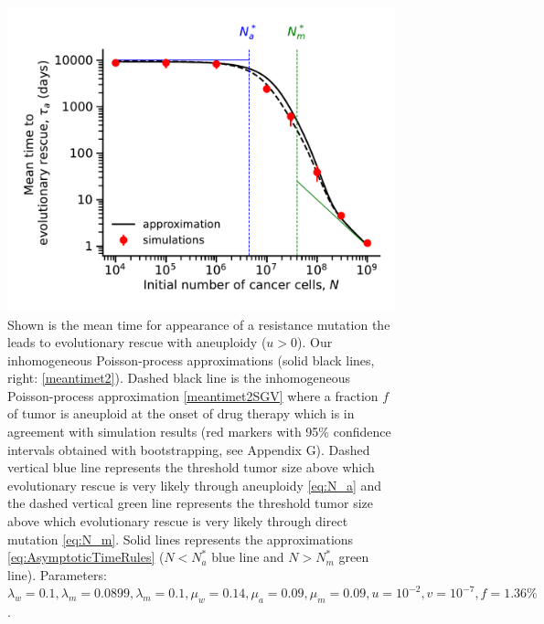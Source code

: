 \documentclass[12pt]{extarticle}
\begin{document}
\begin{figure}
\vspace*{1\baselineskip}
\includegraphics[width=1\textwidth]{Figures/SGVEvolutionaryRescueTimeComplete.pdf}
\caption{Shown is the mean time for appearance of a resistance mutation the leads to evolutionary rescue with aneuploidy ($u>0$). Our inhomogeneous Poisson-process approximations (solid black lines, right: \cref{meantimet2}). Dashed black line is the  inhomogeneous Poisson-process approximation \cref{meantimet2SGV} where a fraction $f$ of tumor is aneuploid at the onset of drug therapy which is in agreement with simulation results (red markers with 95\% confidence intervals obtained with bootstrapping, see Appendix G). Dashed vertical blue line represents the threshold tumor size above which evolutionary rescue is very likely through aneuploidy \cref{eq:N_a} and the dashed vertical green line represents the threshold tumor size above which evolutionary rescue is very likely through direct mutation \cref{eq:N_m}. Solid lines represents the approximations \cref{eq:AsymptoticTimeRules} ($N<N_a^*$ blue line and $N>N_m^*$ green line). 
Parameters: $\lambda_w=0.1,\lambda_m=0.0899,\lambda_m=0.1,\mu_w=0.14,\mu_a=0.09,\mu_m=0.09, u=10^{-2}, v=10^{-7},f=1.36\%$.}
\label{SGVEvolutionaryRescueTimeComplete}
\end{figure}
\end{document}
